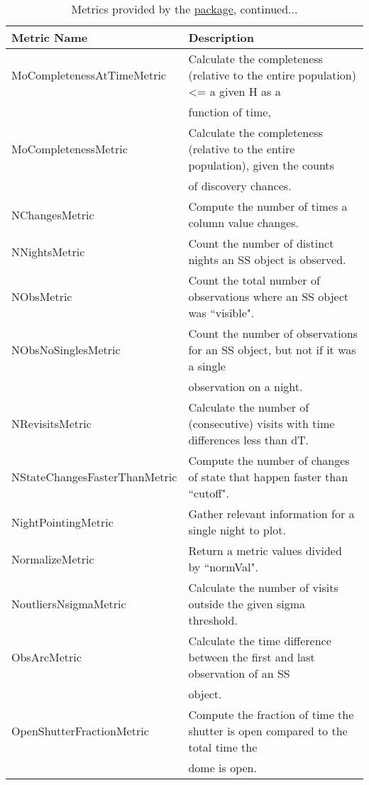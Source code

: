 \begin{table}[!t]
\scriptsize
\setcounter{table}{0}
\makeatletter
\renewcommand{\thetable}{A.\arabic{table}}
\caption{Metrics provided by the
\href{https://github.com/lsst/sims_maf/tree/master/python/lsst/sims/maf}{\MAF package}, continued...}
\medskip
\begin{tabular}{ll}
\hline
                   Metric Name &                                                                       Description \\
\hline\hline
MoCompletenessAtTimeMetric &  Calculate the completeness (relative to the entire population) <= a given H as a \\
  &  function of time, \\
 MoCompletenessMetric &  Calculate the completeness (relative to the entire population), given the counts \\
  &  of discovery chances. \\
 NChangesMetric &  Compute the number of times a column value changes. \\
 NNightsMetric &  Count the number of distinct nights an SS object is observed. \\
 NObsMetric &  Count the total number of observations where an SS object was ``visible". \\
 NObsNoSinglesMetric &  Count the number of observations for an SS object, but not if it was a single \\
  &  observation on a night. \\
 NRevisitsMetric &  Calculate the number of (consecutive) visits with time differences less than dT. \\
 NStateChangesFasterThanMetric &  Compute the number of changes of state that happen faster than ``cutoff". \\
 NightPointingMetric &  Gather relevant information for a single night to plot. \\
 NormalizeMetric &  Return a metric values divided by ``normVal". \\
 NoutliersNsigmaMetric &  Calculate the number of visits outside the given sigma threshold. \\
 ObsArcMetric &  Calculate the time difference between the first and last observation of an SS \\
  &  object. \\
 OpenShutterFractionMetric &  Compute the fraction of time the shutter is open compared to the total time the \\
  &  dome is open. \\

\end{tabular}
\end{table}
